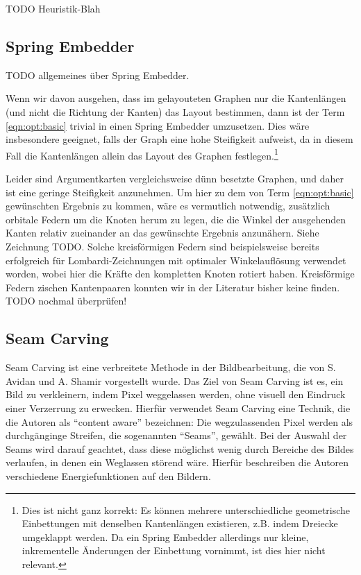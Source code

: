 TODO Heuristik-Blah

\subsection{Spring Embedder}

TODO allgemeines über Spring Embedder.\cite{kobourov2012spring}

Wenn wir davon ausgehen, dass im gelayouteten Graphen nur die Kantenlängen (und nicht die Richtung der Kanten) das Layout bestimmen, dann ist der Term \ref{eqn:opt:basic} trivial in einen Spring Embedder umzusetzen. Dies wäre insbesondere geeignet, falls der Graph eine hohe Steifigkeit aufweist, da in diesem Fall die Kantenlängen allein das Layout des Graphen festlegen.\footnote{Dies ist nicht ganz korrekt: Es können mehrere unterschiedliche geometrische Einbettungen mit denselben Kantenlängen existieren, z.B. indem Dreiecke umgeklappt werden. Da ein Spring Embedder allerdings nur kleine, inkrementelle Änderungen der Einbettung vornimmt, ist dies hier nicht relevant.}

Leider sind Argumentkarten vergleichsweise dünn besetzte Graphen, und daher ist eine geringe Steifigkeit anzunehmen. Um hier zu dem von Term \ref{eqn:opt:basic} gewünschten Ergebnis zu kommen, wäre es vermutlich notwendig, zusätzlich orbitale Federn um die Knoten herum zu legen, die die Winkel der ausgehenden Kanten relativ zueinander an das gewünschte Ergebnis anzunähern. Siehe Zeichnung TODO. Solche kreisförmigen Federn sind beispielsweise bereits erfolgreich für Lombardi-Zeichnungen mit optimaler Winkelauflösung verwendet worden\cite{chernobelskiy2012force}, wobei hier die Kräfte den kompletten Knoten rotiert haben. Kreisförmige Federn zischen Kantenpaaren konnten wir in der Literatur bisher keine finden. TODO nochmal überprüfen!

\subsection{Seam Carving}

Seam Carving ist eine verbreitete Methode in der Bildbearbeitung, die von S. Avidan und A. Shamir vorgestellt wurde.\cite{avidan2007seam} Das Ziel von Seam Carving ist es, ein Bild zu verkleinern, indem Pixel weggelassen werden, ohne visuell den Eindruck einer Verzerrung zu erwecken. Hierfür verwendet Seam Carving eine Technik, die die Autoren als "`content aware"' bezeichnen: Die wegzulassenden Pixel werden als durchgänginge Streifen, die sogenannten "`Seams"', gewählt. Bei der Auswahl der Seams wird darauf geachtet, dass diese möglichst wenig durch Bereiche des Bildes verlaufen, in denen ein Weglassen störend wäre. Hierfür beschreiben die Autoren verschiedene Energiefunktionen auf den Bildern.

